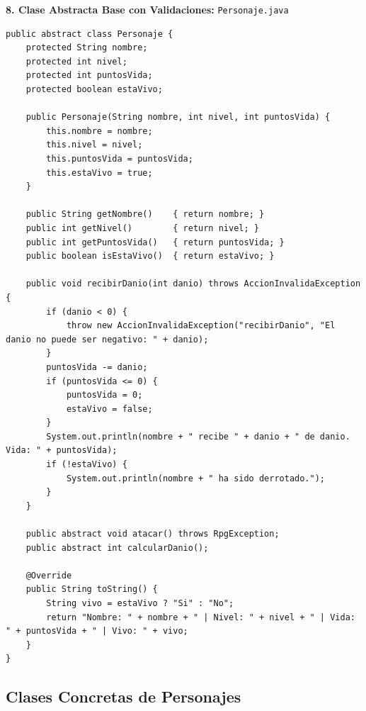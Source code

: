 \documentclass[11pt,letterpaper]{article}
\begin{document}
\textbf{8. Clase Abstracta Base con Validaciones:} \texttt{Personaje.java}
\begin{lstlisting}[style=JavaStyle]
public abstract class Personaje {
    protected String nombre;
    protected int nivel;
    protected int puntosVida;
    protected boolean estaVivo;

    public Personaje(String nombre, int nivel, int puntosVida) {
        this.nombre = nombre;
        this.nivel = nivel;
        this.puntosVida = puntosVida;
        this.estaVivo = true;
    }

    public String getNombre()    { return nombre; }
    public int getNivel()        { return nivel; }
    public int getPuntosVida()   { return puntosVida; }
    public boolean isEstaVivo()  { return estaVivo; }

    public void recibirDanio(int danio) throws AccionInvalidaException {
        if (danio < 0) {
            throw new AccionInvalidaException("recibirDanio", "El danio no puede ser negativo: " + danio);
        }
        puntosVida -= danio;
        if (puntosVida <= 0) {
            puntosVida = 0;
            estaVivo = false;
        }
        System.out.println(nombre + " recibe " + danio + " de danio. Vida: " + puntosVida);
        if (!estaVivo) {
            System.out.println(nombre + " ha sido derrotado.");
        }
    }

    public abstract void atacar() throws RpgException;
    public abstract int calcularDanio();

    @Override
    public String toString() {
        String vivo = estaVivo ? "Si" : "No";
        return "Nombre: " + nombre + " | Nivel: " + nivel + " | Vida: " + puntosVida + " | Vivo: " + vivo;
    }
}
\end{lstlisting}

\subsection{Clases Concretas de Personajes}
\end{document}
